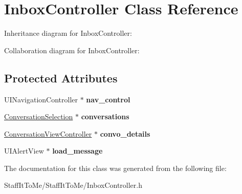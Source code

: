 \hypertarget{interface_inbox_controller}{
\section{\-Inbox\-Controller \-Class \-Reference}
\label{interface_inbox_controller}
}


\-Inheritance diagram for \-Inbox\-Controller\-:


\-Collaboration diagram for \-Inbox\-Controller\-:
\subsection*{\-Protected \-Attributes}
\begin{DoxyCompactItemize}
\item 
\hypertarget{interface_inbox_controller_ad72d1eb927b7f7cc8823ced11c5df51d}{
\-U\-I\-Navigation\-Controller $\ast$ {\bfseries nav\-\_\-control}}
\label{interface_inbox_controller_ad72d1eb927b7f7cc8823ced11c5df51d}

\item 
\hypertarget{interface_inbox_controller_a382c3f7c19257711d7ed8656a9f9c83a}{
\hyperlink{interface_conversation_selection}{\-Conversation\-Selection} $\ast$ {\bfseries conversations}}
\label{interface_inbox_controller_a382c3f7c19257711d7ed8656a9f9c83a}

\item 
\hypertarget{interface_inbox_controller_a0c6d952882f5c5ead17bf45f6749bc37}{
\hyperlink{interface_conversation_view_controller}{\-Conversation\-View\-Controller} $\ast$ {\bfseries convo\-\_\-details}}
\label{interface_inbox_controller_a0c6d952882f5c5ead17bf45f6749bc37}

\item 
\hypertarget{interface_inbox_controller_ada062056937549ba069e50a041cf7ad3}{
\-U\-I\-Alert\-View $\ast$ {\bfseries load\-\_\-message}}
\label{interface_inbox_controller_ada062056937549ba069e50a041cf7ad3}

\end{DoxyCompactItemize}


\-The documentation for this class was generated from the following file\-:\begin{DoxyCompactItemize}
\item 
\-Staff\-It\-To\-Me/\-Staff\-It\-To\-Me/\-Inbox\-Controller.\-h\end{DoxyCompactItemize}

